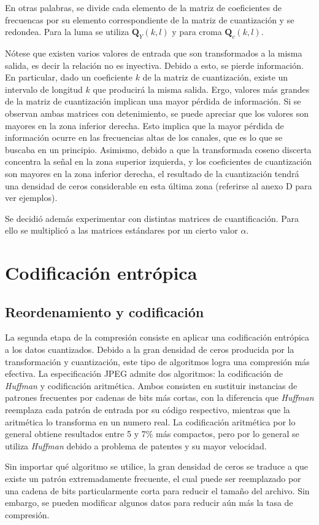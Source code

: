 \documentclass[%
final,
%
reprint,
%
notitlepage,
narroweqnarray,
inline,
twoside,
invited
]{ieee}
\begin{document}
\par En otras palabras, se divide cada elemento de la matriz de coeficientes de frecuencas por su elemento 
correspondiente de la matriz de cuantización y se redondea. Para la luma se utiliza $\mathbf{Q}_Y(k,l)$ y para 
croma $\mathbf{Q}_c(k,l)$.
\par Nótese que existen varios valores de entrada que son transformados a la misma salida, es decir la relación 
no es inyectiva. Debido a esto, se pierde información. En particular, dado un coeficiente $k$ de la matriz 
de cuantización, existe un intervalo de longitud $k$ que producirá la misma salida. Ergo, 
valores más grandes de la matriz de cuantización implican una mayor pérdida de información. Si se observan ambas 
matrices con detenimiento, se puede apreciar que los valores son mayores en la zona inferior derecha. Esto 
implica que la mayor pérdida de información ocurre en las frecuencias altas de los canales, que es lo que se 
buscaba en un principio.  Asimismo, debido a que la transformada coseno discerta concentra la señal en la zona 
superior izquierda, y los coeficientes de cuantización son mayores en la zona inferior derecha, el resultado de la 
cuantización tendrá una densidad de ceros considerable en esta última zona (referirse al anexo D para ver ejemplos).



\par Se decidió además experimentar con distintas matrices de cuantificación. Para ello se multiplicó a las 
matrices estándares por un cierto valor $\alpha$.

\section{Codificación entrópica}

\subsection{Reordenamiento y codificación}

\par La segunda etapa de la compresión consiste en aplicar una codificación entrópica a los datos cuantizados. Debido 
a la gran densidad de ceros producida por la transformación y cuantización, este tipo de algoritmos logra 
una compresión más efectiva. La especificación JPEG admite dos algoritmos: la codificación de \textit{Huffman} y 
codificación aritmética. Ambos consisten en sustituir instancias de patrones frecuentes por cadenas de bits 
más cortas, con la diferencia que \textit{Huffman} reemplaza cada patrón de entrada por su código respectivo, 
mientras que la aritmética lo transforma en un numero real. La codificación aritmética por lo general obtiene 
resultados entre 5 y 7\% más compactos, pero por lo general se utiliza \textit{Huffman} debido a problema de patentes 
y su mayor velocidad.
\par Sin importar qué algoritmo se utilice, la gran densidad de ceros se traduce a que existe un patrón extremadamente 
frecuente, el cual puede ser reemplazado por una cadena de bits particularmente corta para reducir el tamaño del 
archivo. Sin embargo, se pueden modificar algunos datos para reducir aún más la tasa de compresión.
\end{document}

